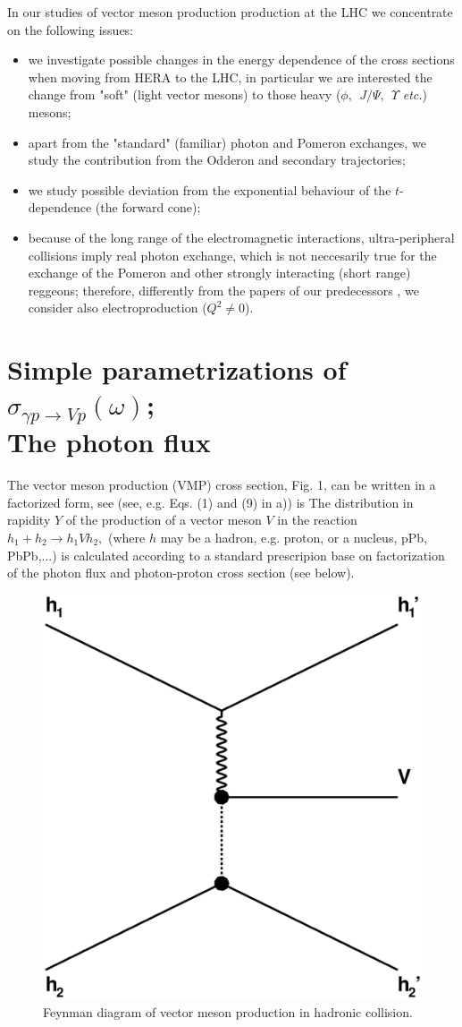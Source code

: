 \documentclass[12pt]{article}
\begin{document}
In our studies of vector meson production production at the LHC we concentrate on the following issues:
\begin{itemize}

\item we investigate possible changes in the energy dependence of the cross sections when moving from HERA to the LHC, in particular we are interested the change from "soft" (light vector mesons) to those heavy ($\phi,\ \ J/\Psi,\ \ \Upsilon$ {\it etc.}) mesons;

\item apart from the "standard" (familiar) photon and Pomeron exchanges, we study the
contribution from the Odderon and secondary trajectories;

\item we study possible deviation from the exponential behaviour of the $t$-dependence
(the forward cone);

\item because of the long range of the electromagnetic interactions, ultra-peripheral collisions imply real photon exchange, which is not neccesarily true for the exchange of the Pomeron and other strongly interacting (short range) reggeons;  therefore, differently from the papers of our predecessors \cite{Schafer, Brazil, Ryskin, Motyka, Szczurek}, we consider also electroproduction ($Q^2\neq 0$).

\end{itemize}

\section{Simple parametrizations of $\sigma_{\gamma p\rightarrow Vp}(\omega)$;\\
The photon flux}\label{simple}

The vector meson production (VMP) cross section, Fig. 1, can be written in a factorized form, see \cite{Brazil, Review} 
(see, e.g. Eqs. (1) and (9) in \cite{Brazil}a)) is
The distribution in rapidity $Y$ of the production of a vector meson $V$ in the reaction $h_1+h_2\rightarrow h_1Vh_2,$ (where $h$ may be a hadron, e.g. proton, or a nucleus, pPb, PbPb,...) is calculated according to a standard prescripion base on factorization of the photon flux and photon-proton cross section (see below).

\begin{figure}[!h]
\centering
 \includegraphics[width=.4\textwidth]{figures/exclusive_vmp.eps}
 \caption{Feynman diagram of vector meson production in hadronic collision.}
 \label{fig:vmp_feynman}
\end{figure}
\end{document}
